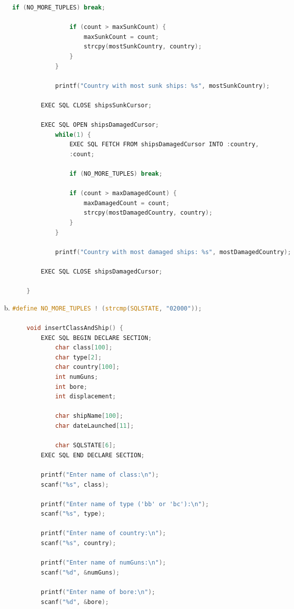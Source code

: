 \documentclass[12pt]{article}
\begin{document}
\begin{enumerate}[1.]
\begin{enumerate}[a)]
\begin{lstlisting}[language=c]
                if (NO_MORE_TUPLES) break;

                if (count > maxSunkCount) {
                    maxSunkCount = count;
                    strcpy(mostSunkCountry, country);
                }
            }

            printf("Country with most sunk ships: %s", mostSunkCountry);

        EXEC SQL CLOSE shipsSunkCursor;

        EXEC SQL OPEN shipsDamagedCursor;
            while(1) {
                EXEC SQL FETCH FROM shipsDamagedCursor INTO :country,
                :count;

                if (NO_MORE_TUPLES) break;

                if (count > maxDamagedCount) {
                    maxDamagedCount = count;
                    strcpy(mostDamagedCountry, country);
                }
            }

            printf("Country with most damaged ships: %s", mostDamagedCountry);

        EXEC SQL CLOSE shipsDamagedCursor;

    }
    \end{lstlisting}

        \item

    \begin{lstlisting}[language=c]
    #define NO_MORE_TUPLES ! (strcmp(SQLSTATE, "02000"));

    void insertClassAndShip() {
        EXEC SQL BEGIN DECLARE SECTION;
            char class[100];
            char type[2];
            char country[100];
            int numGuns;
            int bore;
            int displacement;

            char shipName[100];
            char dateLaunched[11];

            char SQLSTATE[6];
        EXEC SQL END DECLARE SECTION;

        printf("Enter name of class:\n");
        scanf("%s", class);

        printf("Enter name of type ('bb' or 'bc'):\n");
        scanf("%s", type);

        printf("Enter name of country:\n");
        scanf("%s", country);

        printf("Enter name of numGuns:\n");
        scanf("%d", &numGuns);

        printf("Enter name of bore:\n");
        scanf("%d", &bore);


\end{lstlisting}
\end{enumerate}
\end{enumerate}
\end{document}
